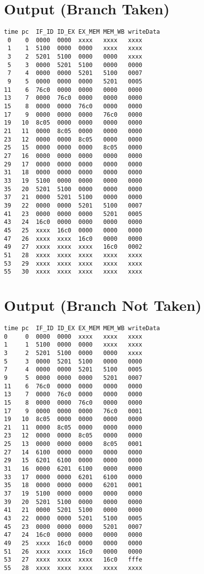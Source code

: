 \documentclass{article}
\newenvironment{problem}[1]{
  \nobreak\section*{#1}
}{}
\begin{document}
  \begin{problem}{Output (Branch Taken)}
    \begin{center}
      \begin{lstlisting}[basicstyle=\footnotesize\ttfamily]
time pc  IF_ID ID_EX EX_MEM MEM_WB writeData
 0    0  0000  0000  xxxx   xxxx   xxxx
 1    1  5100  0000  0000   xxxx   xxxx
 3    2  5201  5100  0000   0000   xxxx
 5    3  0000  5201  5100   0000   0000
 7    4  0000  0000  5201   5100   0007
 9    5  0000  0000  0000   5201   0005
11    6  76c0  0000  0000   0000   0000
13    7  0000  76c0  0000   0000   0000
15    8  0000  0000  76c0   0000   0000
17    9  0000  0000  0000   76c0   0000
19   10  8c05  0000  0000   0000   0000
21   11  0000  8c05  0000   0000   0000
23   12  0000  0000  8c05   0000   0000
25   15  0000  0000  0000   8c05   0000
27   16  0000  0000  0000   0000   0000
29   17  0000  0000  0000   0000   0000
31   18  0000  0000  0000   0000   0000
33   19  5100  0000  0000   0000   0000
35   20  5201  5100  0000   0000   0000
37   21  0000  5201  5100   0000   0000
39   22  0000  0000  5201   5100   0007
41   23  0000  0000  0000   5201   0005
43   24  16c0  0000  0000   0000   0000
45   25  xxxx  16c0  0000   0000   0000
47   26  xxxx  xxxx  16c0   0000   0000
49   27  xxxx  xxxx  xxxx   16c0   0002
51   28  xxxx  xxxx  xxxx   xxxx   xxxx
53   29  xxxx  xxxx  xxxx   xxxx   xxxx
55   30  xxxx  xxxx  xxxx   xxxx   xxxx
      \end{lstlisting}
    \end{center}
  \end{problem}

  \begin{problem}{Output (Branch Not Taken)}
    \begin{center}
      \begin{lstlisting}[basicstyle=\footnotesize\ttfamily]
time pc  IF_ID ID_EX EX_MEM MEM_WB writeData
0     0  0000  0000  xxxx   xxxx   xxxx
1     1  5100  0000  0000   xxxx   xxxx
3     2  5201  5100  0000   0000   xxxx
5     3  0000  5201  5100   0000   0000
7     4  0000  0000  5201   5100   0005
9     5  0000  0000  0000   5201   0007
11    6  76c0  0000  0000   0000   0000
13    7  0000  76c0  0000   0000   0000
15    8  0000  0000  76c0   0000   0000
17    9  0000  0000  0000   76c0   0001
19   10  8c05  0000  0000   0000   0000
21   11  0000  8c05  0000   0000   0000
23   12  0000  0000  8c05   0000   0000
25   13  0000  0000  0000   8c05   0001
27   14  6100  0000  0000   0000   0000
29   15  6201  6100  0000   0000   0000
31   16  0000  6201  6100   0000   0000
33   17  0000  0000  6201   6100   0000
35   18  0000  0000  0000   6201   0001
37   19  5100  0000  0000   0000   0000
39   20  5201  5100  0000   0000   0000
41   21  0000  5201  5100   0000   0000
43   22  0000  0000  5201   5100   0005
45   23  0000  0000  0000   5201   0007
47   24  16c0  0000  0000   0000   0000
49   25  xxxx  16c0  0000   0000   0000
51   26  xxxx  xxxx  16c0   0000   0000
53   27  xxxx  xxxx  xxxx   16c0   fffe
55   28  xxxx  xxxx  xxxx   xxxx   xxxx
      \end{lstlisting}
    \end{center}
  \end{problem}
\end{document}
